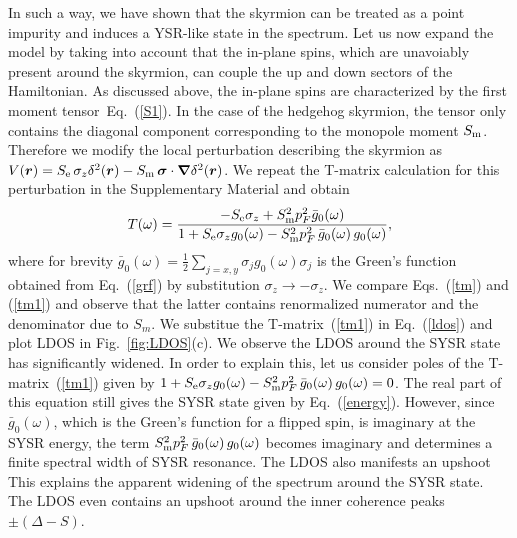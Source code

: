 \documentclass[twocolumn,showpacs,floatfix,nofootinbib,longbibliography]{revtex4-1}
\begin{document}
 In such a way, we have shown that the skyrmion can be treated as a point impurity and induces a YSR-like state in the spectrum. Let us now expand the model by taking into account that the in-plane spins, which are unavoiably present around the skyrmion, can couple the up and down sectors of the Hamiltonian. As discussed above, the in-plane spins are characterized by the first moment tensor~Eq.~(\ref{S1}). In the case of the hedgehog skyrmion, the tensor only contains the diagonal component corresponding to the monopole moment $S_{\rm m}$. Therefore we modify the local perturbation describing the skyrmion as $V(\bm r) =  S_{\rm e}\, \sigma_z\delta^2(\bm r) - S_{\rm m}\, \bm\sigma\cdot\bm \nabla\delta^2(\bm r)$. We repeat the T-matrix calculation for this perturbation in the Supplementary Material and obtain
\begin{align}
	T(\omega) =   \frac{-S_{\rm e}\sigma_z+S^2_{\rm m}p_F^2\bar g_{0}(\omega)}{1+S_{\rm e}\sigma_zg_{0}(\omega)-S^2_{\rm m}p_F^2\,\bar g_{0}(\omega)\, g_{0}(\omega)}, \label{tm1}
\end{align}
where for brevity $\bar g_0(\omega) = \frac{1}{2}\sum_{j=x,y} \sigma_j g_0(\omega) \sigma_j $ is the Green's function obtained from Eq.~(\ref{grf}) by substitution $\sigma_z\rightarrow -\sigma_z$. We compare Eqs.~(\ref{tm}) and (\ref{tm1}) and observe that the latter contains renormalized numerator and the denominator due to $S_m$. We substitue the T-matrix~(\ref{tm1}) in Eq.~(\ref{ldos}) and plot LDOS in Fig.~\ref{fig:LDOS}(c). We observe the LDOS around the SYSR state has significantly widened. In order to explain this, let us consider poles of the T-matrix~(\ref{tm1}) given by $1+S_{\rm e}\sigma_zg_{0}(\omega)-S^2_{\rm m}p_F^2\,\bar g_{0}(\omega)\, g_{0}(\omega)=0$. The real part of this equation still gives the SYSR state given by Eq.~(\ref{energy}). However, since $\bar g_0(\omega)$, which is the Green's function for a flipped spin, is imaginary at the SYSR energy, the term $S^2_{\rm m}p_F^2\,\bar g_{0}(\omega)\, g_{0}(\omega)$ becomes imaginary and determines a finite spectral width of SYSR resonance. The LDOS also manifests an upshoot This explains the apparent widening of the spectrum around the SYSR state.  The LDOS even contains an upshoot around the inner coherence peaks $\pm \left( \Delta-S \right)$.
\end{document}
